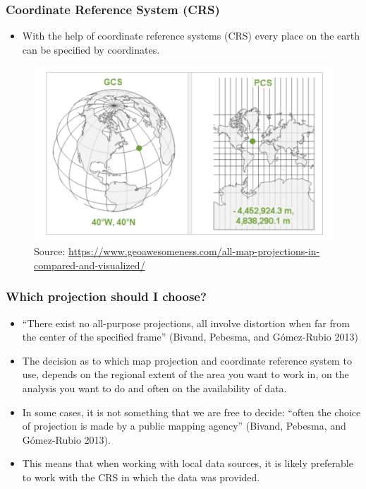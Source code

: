\documentclass[
  shownotes,
  xcolor={svgnames},
  hyperref={colorlinks,citecolor=DarkBlue,linkcolor=andesred,urlcolor=DarkBlue}
  , aspectratio=169]{beamer}
\begin{document}
\begin{frame}[fragile]
\frametitle{Coordinate Reference System (CRS) }

\begin{itemize}
    \item With the help of coordinate reference systems (CRS) every place on the earth can be specified by  coordinates.
\end{itemize}


\begin{figure}[H] \centering
            \captionsetup{justification=centering}
                \includegraphics[scale=0.5]{figures/proj.png}
                \\
                \tiny
                Source: \url{https://www.geoawesomeness.com/all-map-projections-in-compared-and-visualized/}
 \end{figure}


\end{frame}

\begin{frame}[fragile]
\frametitle{Which projection should I choose?}

\begin{itemize}

\item “There exist no all-purpose projections, all involve distortion when far from the center of the specified frame” (Bivand, Pebesma, and Gómez-Rubio 2013)
\medskip
\item The decision as to which map projection and coordinate reference system to use, depends on the regional extent of the area you want to work in, on the analysis you want to do and often on the availability of data.
\medskip
\item In some cases, it is not something that we are free to decide: “often the choice of projection is made by a public mapping agency” (Bivand, Pebesma, and Gómez-Rubio 2013).
\medskip
    \item  This means that when working with local data sources, it is likely preferable to work with the CRS in which the data was provided.
\end{itemize}

\end{frame}
\end{document}
